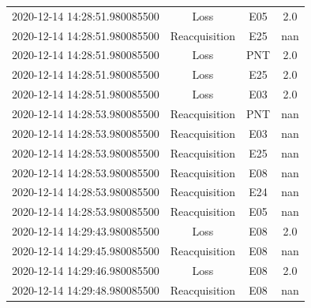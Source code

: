 \begin{enumerate}
\begin{longtabu}{cccc}
2020{-}12{-}14 14:28:51.980085500&Loss&E05&2.0\\%
2020{-}12{-}14 14:28:51.980085500&Reacquisition&E25&nan\\%
2020{-}12{-}14 14:28:51.980085500&Loss&PNT&2.0\\%
2020{-}12{-}14 14:28:51.980085500&Loss&E25&2.0\\%
2020{-}12{-}14 14:28:51.980085500&Loss&E03&2.0\\%
2020{-}12{-}14 14:28:53.980085500&Reacquisition&PNT&nan\\%
2020{-}12{-}14 14:28:53.980085500&Reacquisition&E03&nan\\%
2020{-}12{-}14 14:28:53.980085500&Reacquisition&E25&nan\\%
2020{-}12{-}14 14:28:53.980085500&Reacquisition&E08&nan\\%
2020{-}12{-}14 14:28:53.980085500&Reacquisition&E24&nan\\%
2020{-}12{-}14 14:28:53.980085500&Reacquisition&E05&nan\\%
2020{-}12{-}14 14:29:43.980085500&Loss&E08&2.0\\%
2020{-}12{-}14 14:29:45.980085500&Reacquisition&E08&nan\\%
2020{-}12{-}14 14:29:46.980085500&Loss&E08&2.0\\%
2020{-}12{-}14 14:29:48.980085500&Reacquisition&E08&nan\\%
\hline%
\end{longtabu}%
\end{enumerate}

